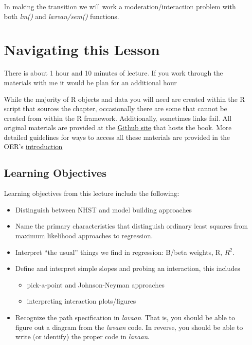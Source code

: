 \documentclass[
  11pt,
]{book}
\providecommand{\tightlist}{%
  \setlength{\itemsep}{0pt}\setlength{\parskip}{0pt}}
\begin{document}
In making the transition we will work a moderation/interaction problem with both \emph{lm()} and \emph{lavvan/sem()} functions.

\hypertarget{navigating-this-lesson-6}{%
\section{Navigating this Lesson}\label{navigating-this-lesson-6}}

There is about 1 hour and 10 minutes of lecture. If you work through the materials with me it would be plan for an additional hour

While the majority of R objects and data you will need are created within the R script that sources the chapter, occasionally there are some that cannot be created from within the R framework. Additionally, sometimes links fail. All original materials are provided at the \href{https://github.com/lhbikos/ReC_MultivModel}{Github site} that hosts the book. More detailed guidelines for ways to access all these materials are provided in the OER's \protect\hyperlink{ReCintro}{introduction}

\hypertarget{learning-objectives-6}{%
\subsection{Learning Objectives}\label{learning-objectives-6}}

Learning objectives from this lecture include the following:

\begin{itemize}
\tightlist
\item
  Distinguish between NHST and model building approaches
\item
  Name the primary characteristics that distinguish ordinary least squares from maximum likelihood approaches to regression.
\item
  Interpret ``the usual'' things we find in regression: B/beta weights, R, \(R^{2}\).
\item
  Define and interpret simple slopes and probing an interaction, this includes

  \begin{itemize}
  \tightlist
  \item
    pick-a-point and Johnson-Neyman approaches
  \item
    interpreting interaction plots/figures
  \end{itemize}
\item
  Recognize the path specification in \emph{lavaan}. That is, you should be able to figure out a diagram from the \emph{lavaan} code. In reverse, you should be able to write (or identify) the proper code in \emph{lavaan}.
\end{itemize}
\end{document}
